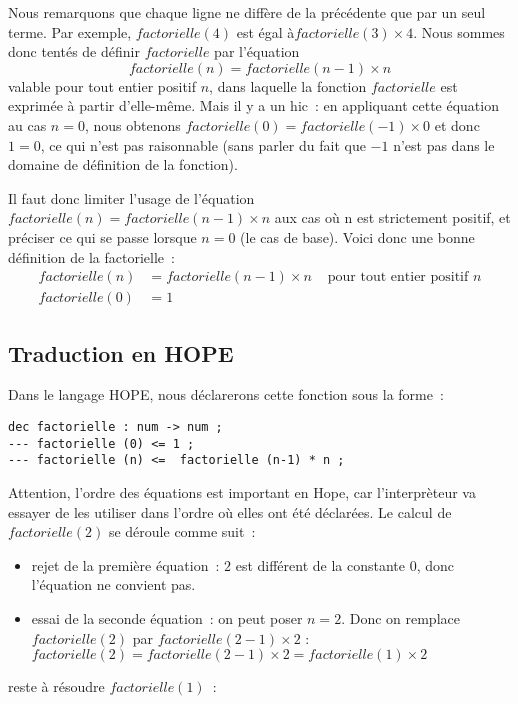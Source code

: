 Nous remarquons que chaque ligne ne diffère de la précédente que par
un seul terme. Par exemple, $factorielle(4)$ est égal à$
factorielle(3) \times 4$. Nous sommes donc tentés de définir
$factorielle$ par l'équation~
	$$factorielle (n) = factorielle (n-1) \times n $$ valable pour
tout entier positif $n$, dans laquelle la fonction $factorielle$ est
exprimée à partir d'elle-m\^eme. Mais il y a un hic~: en appliquant
cette équation au cas $n=0$, nous obtenons $ factorielle(0) =
factorielle(-1)\times0$ et donc $1=0$, ce qui n'est pas raisonnable
(sans parler du fait que $-1$ n'est pas dans le domaine de définition
de la fonction).

Il faut donc limiter l'usage de l'équation $factorielle (n) =
factorielle(n-1) \times n$ aux cas o\`u n est strictement positif, et
préciser ce qui se passe lorsque $n=0$ (le cas de base). Voici donc
une bonne définition de la factorielle~:
$$\begin{array}{rll}
factorielle (n) &= factorielle (n-1) \times n & 
\mbox{\ pour tout entier positif\ } n \\
factorielle (0) &= 	1
\end{array}$$


\subsection*{Traduction en HOPE}

Dans le langage HOPE, nous déclarerons cette fonction sous la forme~:
\begin{verbatim}
dec factorielle : num -> num ;
--- factorielle (0) <= 1 ;
--- factorielle (n) <=  factorielle (n-1) * n ;
\end{verbatim}

Attention, l'ordre des équations est important en Hope, car
l'interprèteur va essayer de les utiliser dans l'ordre o\`u elles ont
été déclarées. Le calcul de $factorielle(2)$ se déroule comme suit~:

\begin{itemize}
\item rejet de la première équation~: $2$ est différent de la constante $ 0 $, donc l'équation ne convient pas.
\item essai de la seconde équation~: on peut poser $n=2$. Donc on remplace
$ factorielle(2)$ par $factorielle(2-1)\times 2$ :
	$factorielle(2) = factorielle(2-1)\times 2 = factorielle(1)\times 2$
\end{itemize}

reste à résoudre $factorielle(1)$~:

